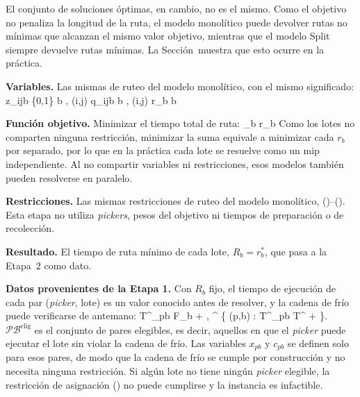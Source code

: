 El conjunto de soluciones óptimas, en cambio, no es el mismo. Como el
objetivo no penaliza la longitud de la ruta, el modelo monolítico puede
devolver rutas no mínimas que alcanzan el mismo valor objetivo, mientras que
el modelo Split siempre devuelve rutas mínimas. La
Sección~ muestra que esto ocurre en la práctica.

\startsubsection[title={Etapa 1: ruteo de cada lote}, reference=sec:split_etapa1]

{\bf Variables.} Las mismas de ruteo del modelo monolítico, con el mismo
significado:
\startformula
	\startalign[n=2, align={right,left}]
		\NC z_{ijb} \in \{0,1\} \NC \quad \forall b \in {},\; (i,j) \in {} \NR
		\NC q_{ijb}  \NC \quad \forall b \in {},\; (i,j) \in {} \NR
		\NC r_b  \NC \quad \forall b \in {} \NR
	\stopalign
\stopformula

{\bf Función objetivo.} Minimizar el tiempo total de ruta:
\startplaceformula[reference=eq:split_objetivo1]
\startformula
	\min \quad \sum_{b \in {}} r_b
\stopformula
\stopplaceformula
Como los lotes no comparten ninguna restricción, minimizar la suma equivale a
minimizar cada $r_b$ por separado, por lo que en la práctica cada lote se
resuelve como un \ac{mip} independiente. Al no compartir variables ni
restricciones, esos modelos también pueden resolverse en paralelo.

{\bf Restricciones.} Las mismas restricciones de ruteo del modelo
monolítico, ()--(). Esta etapa no
utiliza {\em pickers}, pesos del objetivo ni tiempos de preparación o de
recolección.

{\bf Resultado.} El tiempo de ruta mínimo de cada lote,
$R_b = r_b^{*}$, que pasa a la Etapa~2 como dato.

\stopsubsection

\startsubsection[title={Etapa 2: asignación, secuencia y cadena de frío}, reference=sec:split_etapa2]

{\bf Datos provenientes de la Etapa 1.}
Con $R_b$ fijo, el tiempo de ejecución de cada par ({\em picker}, lote) es
un valor conocido antes de resolver, y la cadena de frío puede verificarse de
antemano:
\startformula
	\startalign[n=2, align={right,left}]
		\NC T^{}_{pb} \EQ F_b + , \NR
		\NC {}^{} \EQ \left\{ (p,b) \in {} \times {} : T^{}_{pb} \leq T^{} + \varepsilon \right\}. \NR
	\stopalign
\stopformula
$\mathcal{PB}^{\text{elig}}$ es el conjunto de pares elegibles, es decir,
aquellos en que el {\em picker} puede ejecutar el lote sin violar la cadena
de frío. Las variables $x_{pb}$ y $c_{pb}$ se definen solo para esos pares,
de modo que la cadena de frío se cumple por construcción y no necesita
ninguna restricción. Si algún lote no tiene ningún {\em picker} elegible, la
restricción de asignación () no puede cumplirse y la
instancia es infactible.

